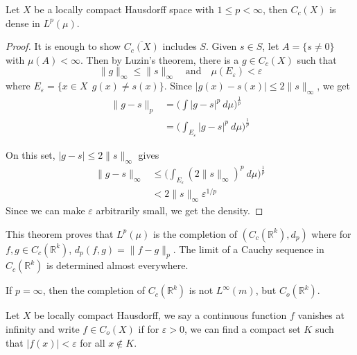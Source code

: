 \begin{theorem}
  Let $X$ be a locally compact Hausdorff space with $1 \le p <
  \infty$, then $C_c(X)$ is dense in $L^p(\mu)$.
\end{theorem}
\begin{proof}
  It is enough to show $\overline{C_c(X)}$ includes $S$. Given $s \in
  S$, let $A = \{ s \neq 0  \}$ with $ \mu(A) < \infty$. Then by
  Luzin's theorem, there is a $g \in C_c(X)$ such that \[
    \|g\|_\infty \le \|s\|_\infty \quad \textrm{and} \quad
    \mu(E_\varepsilon) < \varepsilon
  \]
  where $E_\varepsilon = \{ x \in X \:\ g(x) \neq s(x) \}$. Since
  $|g(x) - s(x)| \le 2 \|s\|_\infty$, we get
  \begin{align*}
    \|g - s\|_p &= \Big( \int |g - s|^p \ d \mu\Big)^{\frac{1}{p}} \\
    &= \Big( \int_{E_\varepsilon} | g - s|^p \ d \mu \Big)^{\frac{1}{p}}
  \end{align*}

  On this set, $|g - s| \le 2 \|s\|_\infty$ gives
  \begin{align*}
    \|g - s\|_\infty & \le \Big( \int_{E_\varepsilon} (2
    \|s\|_\infty)^p \ d \mu \Big)^{\frac{1}{p}} \\
    & < 2 \|s\|_\infty \varepsilon^{1/p}
  \end{align*}
  Since we can make $\varepsilon$ arbitrarily small, we get the density.
\end{proof}

\begin{remark}
  This theorem proves that $L^p(\mu)$ is the completion of
  $(C_c(\mathbb{R}^k), d_p)$ where for $f, g \in C_c(\mathbb{R}^k)$,
  $ d_p(f, g) = \| f - g\|_p$.
  The limit of a Cauchy sequence in $C_c(\mathbb{R}^k)$ is determined
  almost everywhere.

  If $p = \infty$, then the completion of $C_c(\mathbb{R}^k)$ is not
  $L^\infty(m)$, but $C_o(\mathbb{R}^k)$.
\end{remark}

\begin{definition}
  Let $X$ be locally compact Hausdorff, we say a continuous function
  $f$ vanishes at infinity and write $f \in C_o(X)$ if for
  $\varepsilon>0$, we can find a compact set $K$ such that $|f(x)| <
  \varepsilon$ for all $x \notin K$.
\end{definition}

